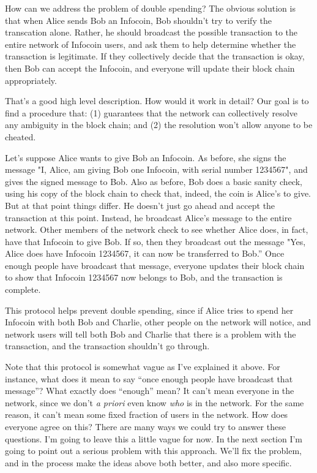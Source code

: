 \documentclass[12pt]{book}
\newcounter{problem}[chapter]
\begin{document}
How can we address the problem of double spending?  The obvious
solution is that when Alice sends Bob an Infocoin, Bob shouldn't try
to verify the transcation alone.  Rather, he should broadcast the
possible transaction to the entire network of Infocoin users, and ask
them to help determine whether the transaction is legitimate.  If they
collectively decide that the transaction is okay, then Bob can accept
the Infocoin, and everyone will update their block chain
appropriately.

That's a good high level description.  How would it work in detail?
Our goal is to find a procedure that: (1) guarantees that the network
can collectively resolve any ambiguity in the block chain; and (2) the
resolution won't allow anyone to be cheated.

Let's suppose Alice wants to give Bob an Infocoin.  As before, she
signs the message "I, Alice, am giving Bob one Infocoin, with serial
number 1234567", and gives the signed message to Bob.  Also as before,
Bob does a basic sanity check, using his copy of the block chain to
check that, indeed, the coin is Alice's to give.  But at that point
things differ.  He doesn't just go ahead and accept the transaction at
this point.  Instead, he broadcast Alice's message to the entire
network.  Other members of the network check to see whether Alice
does, in fact, have that Infocoin to give Bob.  If so, then they
broadcast out the message "Yes, Alice does have Infocoin 1234567, it
can now be transferred to Bob.''  Once enough people have broadcast
that message, everyone updates their block chain to show that Infocoin
1234567 now belongs to Bob, and the transaction is complete.

This protocol helps prevent double spending, since if Alice tries to
spend her Infocoin with both Bob and Charlie, other people on the
network will notice, and network users will tell both Bob and Charlie
that there is a problem with the transaction, and the transaction
shouldn't go through.

Note that this protocol is somewhat vague as I've explained it above.
For instance, what does it mean to say ``once enough people have
broadcast that message''?  What exactly does ``enough'' mean?  It
can't mean everyone in the network, since we don't \emph{a priori}
even know \emph{who} is in the network.  For the same reason, it can't
mean some fixed fraction of users in the network.  How does everyone
agree on this?  There are many ways we could try to answer these
questions.  I'm going to leave this a little vague for now.  In the
next section I'm going to point out a serious problem with this
approach.  We'll fix the problem, and in the process make the ideas
above both better, and also more specific.
\end{document}
